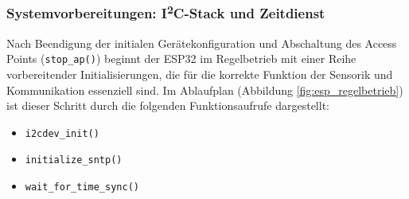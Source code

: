 \subsubsection{Systemvorbereitungen: I\textsuperscript{2}C-Stack und Zeitdienst}

Nach Beendigung der initialen Gerätekonfiguration und Abschaltung des Access Points (\texttt{stop\_ap()}) beginnt der ESP32 im Regelbetrieb mit einer Reihe vorbereitender Initialisierungen, die für die korrekte Funktion der Sensorik und Kommunikation essenziell sind. Im Ablaufplan (Abbildung \vref{fig:esp_regelbetrieb}) ist dieser Schritt durch die folgenden Funktionsaufrufe dargestellt:

\begin{itemize}
	\item \texttt{i2cdev\_init()}
	\item \texttt{initialize\_sntp()}
	\item \texttt{wait\_for\_time\_sync()}
\end{itemize}
\vspace{1em}

